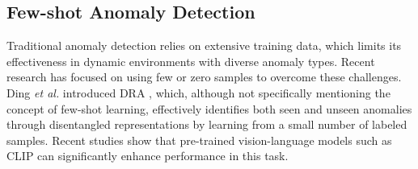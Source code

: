\subsection{Few-shot Anomaly Detection}

Traditional anomaly detection relies on extensive training data, which limits its effectiveness in dynamic environments with diverse anomaly types. Recent research has focused on using few or zero samples to overcome these challenges.
Ding \textit{et al.} introduced DRA \cite{ding2022catching}, which, although not specifically mentioning the concept of few-shot learning, effectively identifies both seen and unseen anomalies through disentangled representations by learning from a small number of labeled samples. %
Recent studies show that pre-trained vision-language models such as CLIP can significantly enhance performance in this task.
